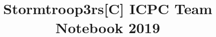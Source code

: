 \documentclass[10pt]{article}
\title{\vspace{-4ex}\Large{Stormtroop3rs[C] ICPC Team Notebook 2019}}
\author{}
\date{}
\begin{document}
\begin{landscape}
\begin{multicols}{2}

\maketitle
\vspace{-13ex}
\tableofcontents
\pagestyle{fancy}



\end{multicols}
\end{landscape}
\end{document}
